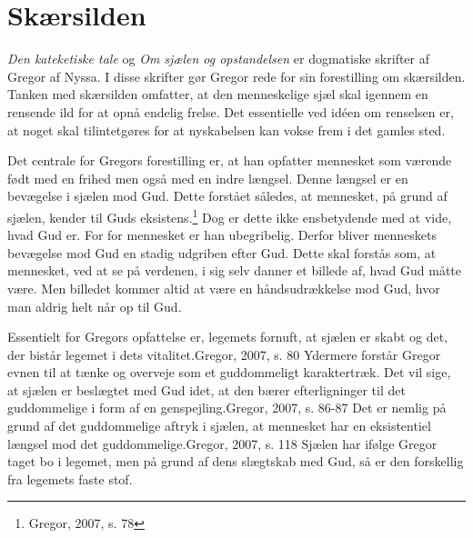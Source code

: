 \chapter{Skærsilden}
\textit{Den kateketiske tale} og \textit{Om sjælen og opstandelsen} er dogmatiske skrifter af Gregor af Nyssa. I disse skrifter gør Gregor rede for sin forestilling om skærsilden. Tanken med skærsilden omfatter, at den menneskelige sjæl skal igennem en rensende ild for at opnå endelig frelse. Det essentielle ved idéen om renselsen er, at noget skal tilintetgøres for at nyskabelsen kan vokse frem i det gamles sted.

Det centrale for Gregors forestilling er, at han opfatter mennesket som værende født med en frihed men også med en indre længsel. Denne længsel er en bevægelse i sjælen mod Gud. Dette forstået således, at mennesket, på grund af sjælen, kender til Guds eksistens.\footnote{Gregor, 2007, s. 78} Dog er dette ikke ensbetydende med at vide, hvad Gud er. For for mennesket er han ubegribelig. Derfor bliver menneskets bevægelse mod Gud en stadig udgriben efter Gud. Dette skal forstås som, at mennesket, ved at se på verdenen, i sig selv danner et billede af, hvad Gud måtte være. Men billedet kommer altid at være en håndsudrækkelse mod Gud, hvor man aldrig helt når op til Gud.

Essentielt for Gregors opfattelse er, legemets fornuft, at sjælen er skabt og det, der bistår legemet i dets vitalitet.{Gregor, 2007, s. 80} Ydermere forstår Gregor evnen til at tænke og overveje som et guddommeligt karaktertræk. Det vil sige, at sjælen er beslægtet med Gud idet, at den bærer efterligninger til det guddommelige i form af en genspejling.{Gregor, 2007, s. 86-87} Det er nemlig på grund af det guddommelige aftryk i sjælen, at mennesket har en eksistentiel længsel mod det guddommelige.{Gregor, 2007, s. 118} Sjælen har ifølge Gregor taget bo i legemet, men på grund af dens slægtskab med Gud, så er den forskellig fra legemets faste stof.

